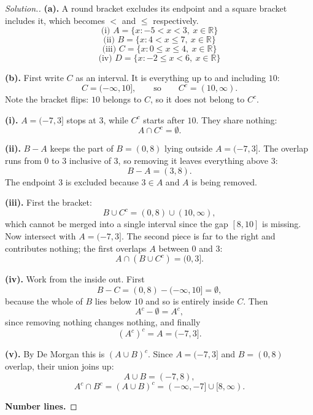 \documentclass[11pt,a4paper]{article}
\theoremstyle{definition}
\newenvironment{solution}
  {\renewcommand{\qedsymbol}{}\begin{proof}[\textit{Solution}.]}
  {\end{proof}}
\begin{document}
\begin{solution}
\textbf{(a).} A round bracket excludes its endpoint and a square bracket includes it,
which becomes $<$ and $\leq$ respectively.
$$\text{(i) } A=\{x: -5<x<3,\ x\in\mathbb{R}\}$$
$$\text{(ii) } B=\{x: 4<x\leq 7,\ x\in\mathbb{R}\}$$
$$\text{(iii) } C=\{x: 0\leq x\leq 4,\ x\in\mathbb{R}\}$$
$$\text{(iv) } D=\{x: -2\leq x<6,\ x\in\mathbb{R}\}$$

\textbf{(b).} First write $C$ as an interval. It is everything up to and including
$10$:
$$C=(-\infty,10],\qquad\text{so}\qquad C^c=(10,\infty).$$
Note the bracket flips: $10$ belongs to $C$, so it does not belong to $C^c$.

\textbf{(i).} $A=(-7,3]$ stops at $3$, while $C^c$ starts after $10$. They share nothing:
$$A\cap C^c=\emptyset.$$

\textbf{(ii).} $B-A$ keeps the part of $B=(0,8)$ lying outside $A=(-7,3]$. The overlap
runs from $0$ to $3$ inclusive of $3$, so removing it leaves everything above $3$:
$$B-A=(3,8).$$
The endpoint $3$ is excluded because $3\in A$ and $A$ is being removed.

\textbf{(iii).} First the bracket:
$$B\cup C^c=(0,8)\cup(10,\infty),$$
which cannot be merged into a single interval since the gap $[8,10]$ is missing. Now
intersect with $A=(-7,3]$. The second piece is far to the right and contributes nothing;
the first overlaps $A$ between $0$ and $3$:
$$A\cap\left(B\cup C^c\right)=(0,3].$$

\textbf{(iv).} Work from the inside out. First
$$B-C=(0,8)-(-\infty,10]=\emptyset,$$
because the whole of $B$ lies below $10$ and so is entirely inside $C$. Then
$$A^c-\emptyset=A^c,$$
since removing nothing changes nothing, and finally
$$\left(A^c\right)^c=A=(-7,3].$$

\textbf{(v).} By De Morgan this is $(A\cup B)^c$. Since $A=(-7,3]$ and $B=(0,8)$
overlap, their union joins up:
$$A\cup B=(-7,8),$$
$$A^c\cap B^c=(A\cup B)^c=(-\infty,-7]\cup[8,\infty).$$

\textbf{Number lines.}


\end{solution}
\end{document}
